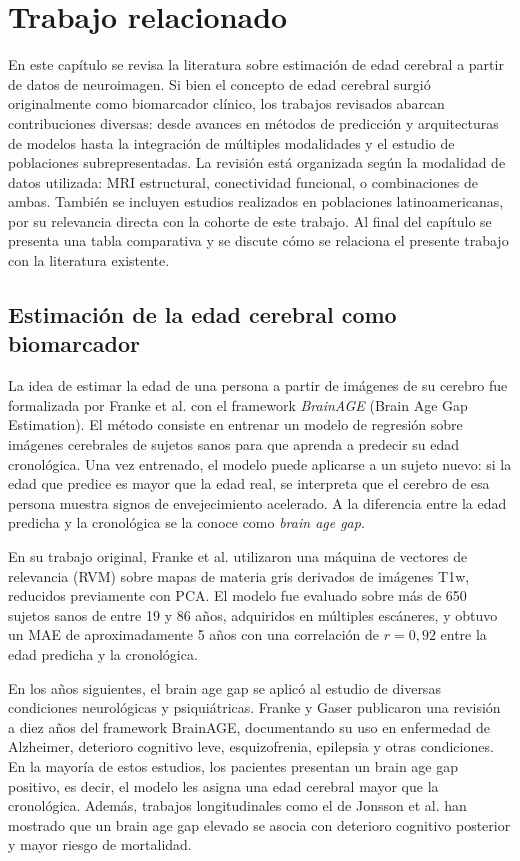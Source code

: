 \chapter{Trabajo relacionado}
\label{chapter:trabajo_relacionado}

En este capítulo se revisa la literatura sobre estimación de edad cerebral a partir de datos de neuroimagen. Si bien el concepto de edad cerebral surgió originalmente como biomarcador clínico, los trabajos revisados abarcan contribuciones diversas: desde avances en métodos de predicción y arquitecturas de modelos hasta la integración de múltiples modalidades y el estudio de poblaciones subrepresentadas. La revisión está organizada según la modalidad de datos utilizada: MRI estructural, conectividad funcional, o combinaciones de ambas. También se incluyen estudios realizados en poblaciones latinoamericanas, por su relevancia directa con la cohorte de este trabajo. Al final del capítulo se presenta una tabla comparativa y se discute cómo se relaciona el presente trabajo con la literatura existente.

\section{Estimación de la edad cerebral como biomarcador}

La idea de estimar la edad de una persona a partir de imágenes de su cerebro fue formalizada por Franke et al. \cite{franke2010estimating} con el framework \textit{BrainAGE} (Brain Age Gap Estimation). El método consiste en entrenar un modelo de regresión sobre imágenes cerebrales de sujetos sanos para que aprenda a predecir su edad cronológica. Una vez entrenado, el modelo puede aplicarse a un sujeto nuevo: si la edad que predice es mayor que la edad real, se interpreta que el cerebro de esa persona muestra signos de envejecimiento acelerado. A la diferencia entre la edad predicha y la cronológica se la conoce como \textit{brain age gap}.

En su trabajo original, Franke et al. utilizaron una máquina de vectores de relevancia (RVM) sobre mapas de materia gris derivados de imágenes T1w, reducidos previamente con PCA. El modelo fue evaluado sobre más de 650 sujetos sanos de entre 19 y 86 años, adquiridos en múltiples escáneres, y obtuvo un MAE de aproximadamente 5 años con una correlación de $r = 0{,}92$ entre la edad predicha y la cronológica.

En los años siguientes, el brain age gap se aplicó al estudio de diversas condiciones neurológicas y psiquiátricas. Franke y Gaser \cite{franke2019ten} publicaron una revisión a diez años del framework BrainAGE, documentando su uso en enfermedad de Alzheimer, deterioro cognitivo leve, esquizofrenia, epilepsia y otras condiciones. En la mayoría de estos estudios, los pacientes presentan un brain age gap positivo, es decir, el modelo les asigna una edad cerebral mayor que la cronológica. Además, trabajos longitudinales como el de Jonsson et al. \cite{jonsson2019brain} han mostrado que un brain age gap elevado se asocia con deterioro cognitivo posterior y mayor riesgo de mortalidad.

